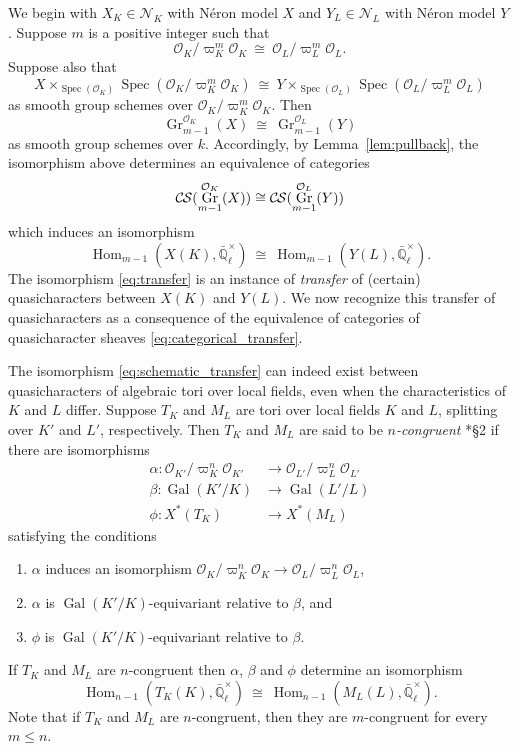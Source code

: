 \documentclass[10pt]{amsart}
\theoremstyle{plain}
\theoremstyle{definition}
\newcommand{\EE}{\mathbb{\bar Q}_\ell}
\newcommand{\OK}{\mathcal{O}_K}
\newcommand{\OL}{\mathcal{O}_L}
\newcommand{\OO}[1]{\mathcal{O}_{#1}}
\newcommand{\Fq}{k}
\newcommand{\EEx}{\EE^\times}
\DeclareMathOperator{\Gal}{Gal}
\DeclareMathOperator{\Hom}{Hom}
\DeclareMathOperator{\Gr}{Gr}
\newcommand{\Spec}[1]{{\operatorname{Spec}(#1)}}
\newcommand{\iso}{{\ \cong\ }}
\newcommand{\CS}{{\mathcal{C\hskip-0.8pt S}}}
\begin{document}
We begin with $X_K\in \mathcal{N}_K$ with N\'eron model $X$ and $Y_{L}\in \mathcal{N}_L$ with N\'eron model $Y$.
Suppose $m$ is a positive integer such that 
\[
\OK/\varpi_K^{m}\OK \iso \OL/\varpi_L^{m}\OL.
\]
Suppose also that
\begin{equation}\label{eq:schematic_transfer}
X \times_{\Spec{\OK}} \Spec{\OK/\varpi_K^{m}\OK} \iso Y \times_{\Spec{\OL}} \Spec{\OL/\varpi_L^{m}\OL}
\end{equation}
as smooth group schemes over $\OK/\varpi_K^{m}\OK$. 
Then
\[
\Gr^{\OK}_{m-1}(X) \iso \Gr^{\OL}_{m-1}(Y)
\]
as smooth group schemes over $\Fq$.  Accordingly, by Lemma~\ref{lem:pullback}, the isomorphism above determines an equivalence of categories
\begin{equation}\label{eq:categorical_transfer}
\CS(\Gr^{\OK}_{m-1}(X)) \cong \CS(\Gr^{\OL}_{m-1}(Y))
\end{equation}
which induces an isomorphism
\begin{equation}\label{eq:transfer}
\Hom_{m-1}(X(K),\EEx)  \iso  \Hom_{m-1}(Y(L),\EEx).
\end{equation}
The isomorphism \eqref{eq:transfer} is an instance of {\it transfer} of (certain) quasicharacters between $X(K)$ and $Y(L)$. 
We now recognize this transfer of quasicharacters as a consequence of the equivalence of categories of quasicharacter sheaves \eqref{eq:categorical_transfer}.

The isomorphism \eqref{eq:schematic_transfer} can indeed exist between quasicharacters of algebraic tori over local fields, even when the characteristics of $K$ and $L$ differ.
Suppose $T_K$ and $M_L$ are tori over local fields $K$ and $L$,
splitting over $K'$ and $L'$, respectively.
Then $T_K$ and $M_L$ are said to be \emph{$n$-congruent} \cite{chai-yu:01a}*{\S 2} if there are isomorphisms
 \begin{align*}
  \alpha : \OO{K'}/\varpi_K^n \OO{K'} &\to \OO{L'}/\varpi_{L}^n \OO{L'} \\
  \beta : \Gal(K'/K) &\to \Gal(L'/L) \\
  \phi : X^*(T_K) &\to X^*(M_L)
 \end{align*}
 satisfying the conditions
 \begin{enumerate}
  \item $\alpha$ induces an isomorphism $\OK/\varpi_K^n \OK \to \OO{L}/\varpi_{L}^n \OO{L}$,
  \item $\alpha$ is $\Gal(K'/K)$-equivariant relative to $\beta$, and
  \item $\phi$ is $\Gal(K'/K)$-equivariant relative to $\beta$.
 \end{enumerate}
If $T_K$ and $M_L$ are $n$-congruent then $\alpha$, $\beta$ and $\phi$ determine an isomorphism 
\begin{equation}\label{transfer}
  \Hom_{n-1}(T_K(K), \EEx) \iso \Hom_{n-1}(M_L(L),\EEx).
\end{equation}
Note that if $T_K$ and $M_L$ are $n$-congruent, then they are $m$-congruent for every
$m \leq n$.
\end{document}
